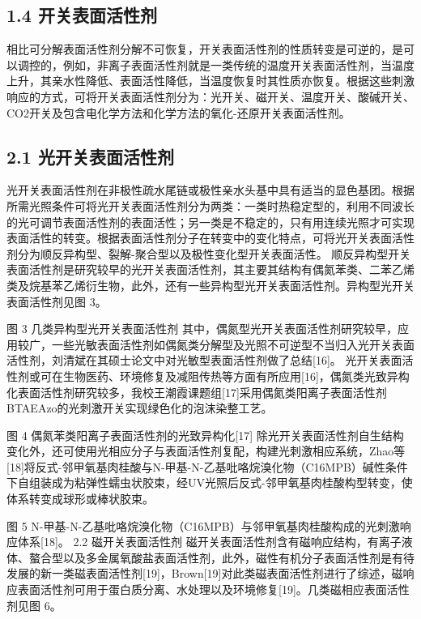 \documentclass[bachelor,winfonts]{jnuthesis}
\begin{document}
\subsection{    1.4	开关表面活性剂}
    相比可分解表面活性剂分解不可恢复，开关表面活性剂的性质转变是可逆的，是可以调控的，例如，非离子表面活性剂就是一类传统的温度开关表面活性剂，当温度上升，其亲水性降低、表面活性降低，当温度恢复时其性质亦恢复。根据这些刺激响应的方式，可将开关表面活性剂分为：光开关、磁开关、温度开关、酸碱开关、CO2开关及包含电化学方法和化学方法的氧化-还原开关表面活性剂\cite{秦勇2009}。
    
\subsection{    2.1 光开关表面活性剂}
    光开关表面活性剂在非极性疏水尾链或极性亲水头基中具有适当的显色基团\cite{张冤帝2017}。根据所需光照条件可将光开关表面活性剂分为两类：一类时热稳定型的，利用不同波长的光可调节表面活性剂的表面活性；另一类是不稳定的，只有用连续光照才可实现表面活性的转变。根据表面活性剂分子在转变中的变化特点，可将光开关表面活性剂分为顺反异构型、裂解-聚合型以及极性变化型开关表面活性\cite{张冤帝2017,李云霞2011}。
    顺反异构型开关表面活性剂是研究较早的光开关表面活性剂，其主要其结构有偶氮苯类、二苯乙烯类及烷基苯乙烯衍生物，此外，还有一些异构型光开关表面活性剂。异构型光开关表面活性剂见图 3\cite{张冤帝2017,karthaus1996,shang2003,吕湘亮2018}。
    
    图 3 几类异构型光开关表面活性剂\cite{张冤帝2017,karthaus1996,shang2003,吕湘亮2018}
    其中，偶氮型光开关表面活性剂研究较早，应用较广，一些光敏表面活性剂如偶氮类分解型及光照不可逆型不当归入光开关表面活性剂，刘清斌在其硕士论文中对光敏型表面活性剂做了总结[16]。
    光开关表面活性剂或可在生物医药、环境修复及减阻传热等方面有所应用[16]，偶氮类光致异构化表面活性剂研究较多，我校王潮霞课题组[17]采用偶氮类阳离子表面活性剂BTAEAzo的光刺激开关实现绿色化的泡沫染整工艺。
    
    图 4 偶氮苯类阳离子表面活性剂的光致异构化[17]
    除光开关表面活性剂自生结构变化外，还可使用光相应分子与表面活性剂复配，构建光刺激相应系统，Zhao等[18]将反式-邻甲氧基肉桂酸与N-甲基-N-乙基吡咯烷溴化物（C16MPB）碱性条件下自组装成为粘弹性蠕虫状胶束，经UV光照后反式-邻甲氧基肉桂酸构型转变，使体系转变成球形或棒状胶束。
    
    图 5 N-甲基-N-乙基吡咯烷溴化物（C16MPB）与邻甲氧基肉桂酸构成的光刺激响应体系[18]。
    2.2 磁开关表面活性剂
    磁开关表面活性剂含有磁响应结构，有离子液体、螯合型以及多金属氧酸盐表面活性剂，此外，磁性有机分子表面活性剂是有待发展的新一类磁表面活性剂[19]，Brown[19]对此类磁表面活性剂进行了综述，磁响应表面活性剂可用于蛋白质分离、水处理以及环境修复[19]。几类磁相应表面活性剂见图 6。
    
\end{document}
